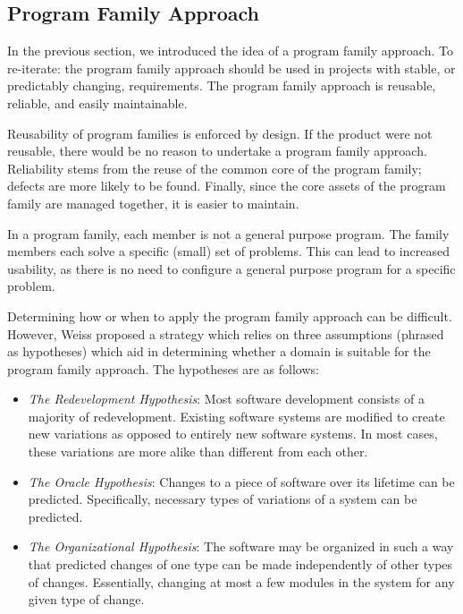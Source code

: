 \documentclass[10pt, preprint]{sigplanconf}
\begin{document}
\subsection{Program Family Approach} \label{subsec:program}

In the previous section, we introduced the idea of a program family approach. To
re-iterate: the program family approach should be used in projects with stable,
or predictably changing, requirements. The program family approach is reusable,
reliable, and easily maintainable.

Reusability of program families is enforced by design. If the product were not
reusable, there would be no reason to undertake a program family
approach. Reliability stems from the reuse of the common core of the program
family; defects are more likely to be found. Finally, since the core assets of
the program family are managed together, it is easier to maintain.

In a program family, each member is not a general purpose program. The family
members each solve a specific (small) set of problems. This can lead to
increased usability, as there is no need to configure a general purpose program
for a specific problem.

Determining how or when to apply the program family approach can be
difficult. However, Weiss \cite{Weiss} proposed a strategy which relies on three
assumptions (phrased as hypotheses) which aid in determining whether a domain is
suitable for the program family approach. The hypotheses are as follows:

\begin{itemize}
\item \textit{The Redevelopment Hypothesis}: Most software development consists
  of a majority of redevelopment. Existing software systems are modified to
  create new variations as opposed to entirely new software systems. In most
  cases, these variations are more alike than different from each other.
\item \textit{The Oracle Hypothesis}: Changes to a piece of software over its
  lifetime can be predicted. Specifically, necessary types of variations of a
  system can be predicted.
\item \textit{The Organizational Hypothesis}: The software may be organized in
  such a way that predicted changes of one type can be made independently of
  other types of changes. Essentially, changing at most a few modules in the
  system for any given type of change.
\end{itemize}
\end{document}
